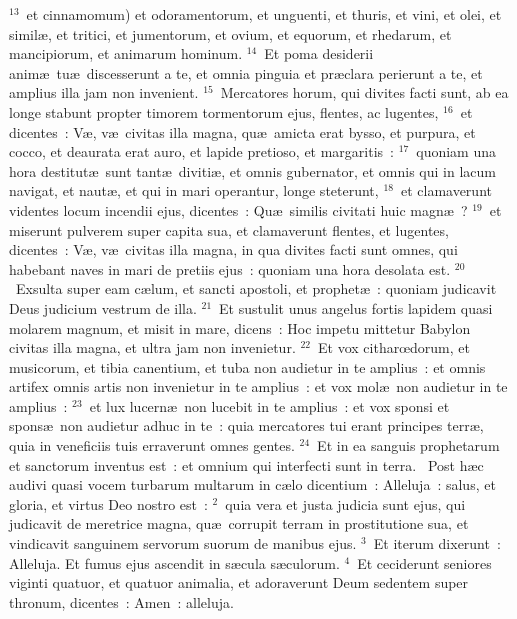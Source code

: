 ${}^{13}$~et cinnamomum) et odoramentorum, et unguenti, et thuris, et vini, et olei, et simil\ae , et tritici, et jumentorum, et ovium, et equorum, et rhedarum, et mancipiorum, et animarum hominum.
${}^{14}$~Et poma desiderii anim\ae\ tu\ae\ discesserunt a te, et omnia pinguia et pr\ae clara perierunt a te, et amplius illa jam non invenient.
${}^{15}$~Mercatores horum, qui divites facti sunt, ab ea longe stabunt propter timorem tormentorum ejus, flentes, ac lugentes,
${}^{16}$~et dicentes~: V\ae , v\ae\ civitas illa magna, qu\ae\ amicta erat bysso, et purpura, et cocco, et deaurata erat auro, et lapide pretioso, et margaritis~:
${}^{17}$~quoniam una hora destitut\ae\ sunt tant\ae\ diviti\ae , et omnis gubernator, et omnis qui in lacum navigat, et naut\ae , et qui in mari operantur, longe steterunt,
${}^{18}$~et clamaverunt videntes locum incendii ejus, dicentes~: Qu\ae\ similis civitati huic magn\ae~?
${}^{19}$~et miserunt pulverem super capita sua, et clamaverunt flentes, et lugentes, dicentes~: V\ae , v\ae\ civitas illa magna, in qua divites facti sunt omnes, qui habebant naves in mari de pretiis ejus~: quoniam una hora desolata est.
${}^{20}$~Exsulta super eam c\ae lum, et sancti apostoli, et prophet\ae~: quoniam judicavit Deus judicium vestrum de illa.
${}^{21}$~Et sustulit unus angelus fortis lapidem quasi molarem magnum, et misit in mare, dicens~: Hoc impetu mittetur Babylon civitas illa magna, et ultra jam non invenietur.
${}^{22}$~Et vox citharœdorum, et musicorum, et tibia canentium, et tuba non audietur in te amplius~: et omnis artifex omnis artis non invenietur in te amplius~: et vox mol\ae\ non audietur in te amplius~:
${}^{23}$~et lux lucern\ae\ non lucebit in te amplius~: et vox sponsi et spons\ae\ non audietur adhuc in te~: quia mercatores tui erant principes terr\ae , quia in veneficiis tuis erraverunt omnes gentes.
${}^{24}$~Et in ea sanguis prophetarum et sanctorum inventus est~: et omnium qui interfecti sunt in terra.
~\lettrine[lines=10,image=true,loversize=0.05,lraise=-0.03]{P}{}ost h\ae c audivi quasi vocem turbarum multarum in c\ae lo dicentium~: Alleluja~: salus, et gloria, et virtus Deo nostro est~:
${}^{2}$~quia vera et justa judicia sunt ejus, qui judicavit de meretrice magna, qu\ae\ corrupit terram in prostitutione sua, et vindicavit sanguinem servorum suorum de manibus ejus.
${}^{3}$~Et iterum dixerunt~: Alleluja. Et fumus ejus ascendit in s\ae cula s\ae culorum.
${}^{4}$~Et ceciderunt seniores viginti quatuor, et quatuor animalia, et adoraverunt Deum sedentem super thronum, dicentes~: Amen~: alleluja.
